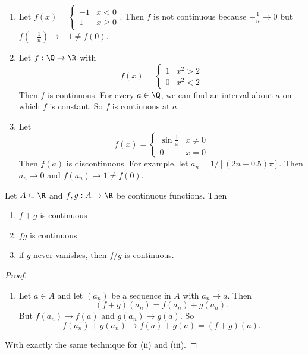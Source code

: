 \documentclass[a4paper]{article}
\begin{document}
\begin{eg}\leavevmode
  \begin{enumerate}
    \item Let $f(x) = \begin{cases} -1 & x < 0 \\ 1 & x\geq 0\end{cases}$. Then $f$ is not continuous because $-\frac{1}{n} \to 0$ but $f(-\frac{1}{n}) \to -1 \not= f(0)$.
    \item Let $f: \Q \to \R$ with
      \[
        f(x) =
        \begin{cases}
          1 & x^2 > 2\\
          0 & x^2 < 2
        \end{cases}
      \]
      Then $f$ is continuous. For every $a\in \Q$, we can find an interval about $a$ on which $f$ is constant. So $f$ is continuous at $a$.
    \item Let
      \[
        f(x) =
        \begin{cases}
          \sin \frac{1}{x} & x \not= 0\\
          0 & x = 0
        \end{cases}
      \]
      Then $f(a)$ is discontinuous. For example, let $a_n = 1/[(2n + 0.5)\pi]$. Then $a_n\to 0$ and $f(a_n) \to 1 \not= f(0)$.
  \end{enumerate}
\end{eg}

\begin{lemma}
  Let $A\subseteq \R$ and $f, g: A\to \R$ be continuous functions. Then
  \begin{enumerate}
    \item $f + g$ is continuous
    \item $fg$ is continuous
    \item if $g$ never vanishes, then $f/g$ is continuous.
  \end{enumerate}
\end{lemma}

\begin{proof}\leavevmode
  \begin{enumerate}
    \item Let $a\in A$ and let $(a_n)$ be a sequence in $A$ with $a_n \to a$. Then
      \[
        (f + g)(a_n) = f(a_n) + g(a_n).
      \]
      But $f(a_n) \to f(a)$ and $g(a_n) \to g(a)$. So
      \[
        f(a_n) + g(a_n) \to f(a) + g(a) = (f + g)(a).
      \]
  \end{enumerate}
  With exactly the same technique for (ii) and (iii).
\end{proof}
\end{document}
